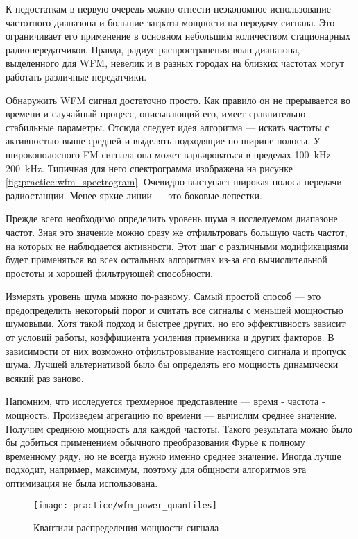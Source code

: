 К недостаткам в первую очередь можно отнести неэкономное использование частотного диапазона и большие затраты мощности на передачу сигнала. Это ограничивает его применение в основном небольшим количеством стационарных радиопередатчиков. Правда, радиус распространения волн диапазона, выделенного для WFM, невелик и в разных городах на близких частотах могут работать различные передатчики.

Обнаружить WFM сигнал достаточно просто. Как правило он не прерывается во времени и случайный процесс, описывающий его, имеет сравнительно стабильные параметры. Отсюда следует идея алгоритма --- искать частоты с активностью выше средней и выделять подходящие по ширине полосы. У широкополосного FM сигнала она может варьироваться в пределах \SIrange{100}{200}{\kilo\hertz}. Типичная для него спектрограмма изображена на рисунке \ref{fig:practice:wfm_spectrogram}. Очевидно выступает широкая полоса передачи радиостанции. Менее яркие линии --- это боковые лепестки.

Прежде всего необходимо определить уровень шума в исследуемом диапазоне частот. Зная это значение можно сразу же отфильтровать большую часть частот, на которых не наблюдается активности. Этот шаг с различными модификациями будет применяться во всех остальных алгоритмах из-за его вычислительной простоты и хорошей фильтрующей способности.

Измерять уровень шума можно по-разному. Самый простой способ --- это предопределить некоторый порог и считать все сигналы с меньшей мощностью шумовыми. Хотя такой подход и быстрее других, но его эффективность зависит от условий работы, коэффициента усиления приемника и других факторов. В зависимости от них возможно отфильтровывание настоящего сигнала и пропуск шума. Лучшей альтернативой было бы определять его мощность динамически всякий раз заново.

Напомним, что исследуется трехмерное представление --- время - частота - мощность. Произведем агрегацию по времени --- вычислим среднее значение. Получим среднюю мощность для каждой частоты. Такого результата можно было бы добиться применением обычного преобразования Фурье к полному временному ряду, но не всегда нужно именно среднее значение. Иногда лучше подходит, например, максимум, поэтому для общности алгоритмов эта оптимизация не была использована.

\begin{figure}[h]
  \centering
  \texttt{[image: practice/wfm\_power\_quantiles]}
  \caption{Квантили распределения мощности сигнала}
  \label{fig:practice:wfm_power_quantiles}
\end{figure}

